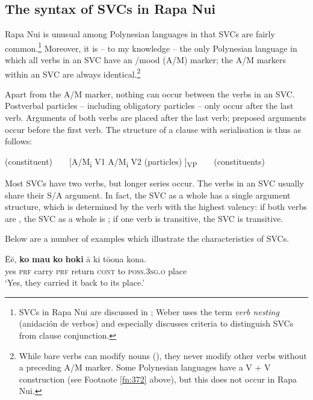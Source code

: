 \subsection{The syntax of SVCs in Rapa Nui}\label{sec:7.7.2}

Rapa Nui is unusual among Polynesian languages in that SVCs are fairly common.\footnote{\label{fn:373}SVCs in Rapa Nui are discussed in \citet[67-75]{WeberR2003}; Weber uses the term \textit{verb nesting} (anidación de verbos) and especially discusses criteria to distinguish SVCs from clause conjunction.} Moreover, it is – to my knowledge – the only Polynesian language in which all verbs in an SVC have an /mood (A/M) marker; the A/M markers within an SVC are always identical.\footnote{\label{fn:374}While bare verbs can modify nouns (), they never modify other verbs without a preceding A/M marker. Some Polynesian languages have a V + V construction (see Footnote \ref{fn:372} above), but this does not occur in Rapa Nui.}

Apart from the A/M marker, nothing can occur between the verbs in an SVC. Postverbal particles – including obligatory particles – only occur after the last verb. Arguments of both verbs are placed after the last verb; preposed arguments occur before the first verb. The structure of a clause with serialisation is thus as follows:

\ea\label{ex:7.170a}
(constituent) ~ ~ [A/M\textsubscript{i}   V1   A/M\textsubscript{i}   V2   (particles) ]\textsubscript{VP} ~ ~  (constituents)
\z

Most SVCs have two verbs, but longer series occur. The verbs in an SVC usually share their S/A argument. In fact, the SVC as a whole has a single argument structure, which is determined by the verb with the highest valency: if both verbs are , the SVC as a whole is ; if one verb is transitive, the SVC is transitive.

Below are a number of examples which illustrate the characteristics of SVCs. 

\ea\label{ex:7.171}
\gll {\ꞌ}Ēē, \textbf{ko} \textbf{ma{\ꞌ}u} \textbf{ko} \textbf{hoki} {\ꞌ}ā ki tō{\ꞌ}ona kona. \\
yes \textsc{prf} carry \textsc{prf} return \textsc{cont} to \textsc{poss.3sg.o} place \\

\glt 
‘Yes, they carried it back to its place.’ \textstyleExampleref{[R413.844]} 
\z

